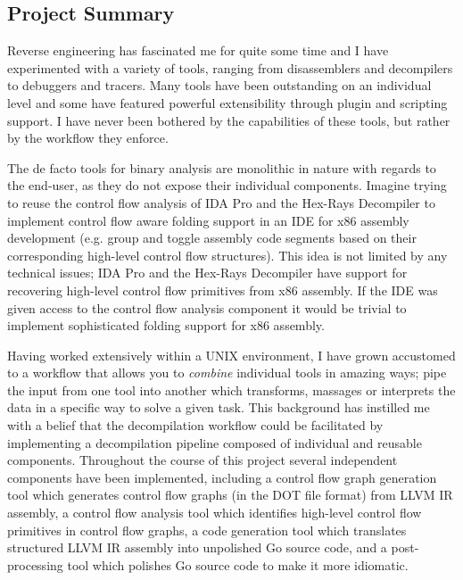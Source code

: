 
\subsection{Project Summary}

Reverse engineering has fascinated me for quite some time and I have experimented with a variety of tools, ranging from disassemblers and decompilers to debuggers and tracers. Many tools have been outstanding on an individual level and some have featured powerful extensibility through plugin and scripting support. I have never been bothered by the capabilities of these tools, but rather by the workflow they enforce.

The de facto tools for binary analysis are monolithic in nature with regards to the end-user, as they do not expose their individual components. Imagine trying to reuse the control flow analysis of IDA Pro and the Hex-Rays Decompiler to implement control flow aware folding support in an IDE for x86 assembly development (e.g. group and toggle assembly code segments based on their corresponding high-level control flow structures). This idea is not limited by any technical issues; IDA Pro and the Hex-Rays Decompiler have support for recovering high-level control flow primitives from x86 assembly. If the IDE was given access to the control flow analysis component it would be trivial to implement sophisticated folding support for x86 assembly.

Having worked extensively within a UNIX environment, I have grown accustomed to a workflow that allows you to \textit{combine} individual tools in amazing ways; pipe the input from one tool into another which transforms, massages or interprets the data in a specific way to solve a given task. This background has instilled me with a belief that the decompilation workflow could be facilitated by implementing a decompilation pipeline composed of individual and reusable components. Throughout the course of this project several independent components have been implemented, including a control flow graph generation tool which generates control flow graphs (in the DOT file format) from LLVM IR assembly, a control flow analysis tool which identifies high-level control flow primitives in control flow graphs, a code generation tool which translates structured LLVM IR assembly into unpolished Go source code, and a post-processing tool which polishes Go source code to make it more idiomatic.

